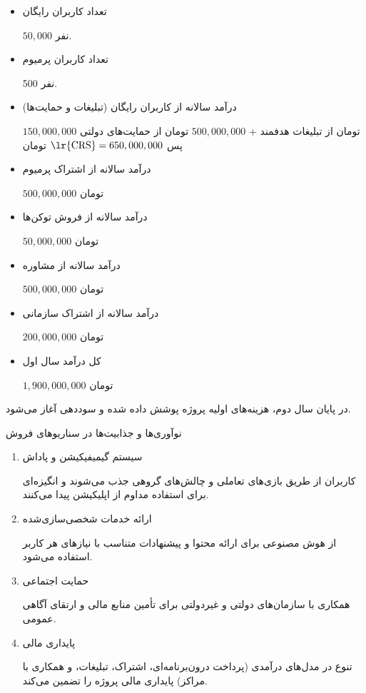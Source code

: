 \documentclass[dvipsnames, svgnames, x11names, 11pt]{article}
\begin{document}
\begin{itemize}
\item 
تعداد کاربران رایگان

$50,000$
نفر.

\item 
تعداد کاربران پرمیوم

500 نفر.

\item 
درآمد سالانه از کاربران رایگان (تبلیغات و حمایت‌ها) 

$150,000,000$
تومان از تبلیغات هدفمند +
$500,000,000$
تومان از حمایت‌های دولتی پس
$\text{\lr{CRS}} = 650,000,000$
تومان

\item 
درآمد سالانه از اشتراک پرمیوم

$500,000,000$
تومان

\item 
درآمد سالانه از فروش توکن‌ها

$50,000,000$
تومان

\item 
درآمد سالانه از مشاوره

$500,000,000$
تومان

\item 
درآمد سالانه از اشتراک سازمانی

$200,000,000$
تومان

\item 
کل درآمد سال اول

$1,900,000,000$
تومان
\end{itemize}

در پایان سال دوم، هزینه‌های اولیه پروژه پوشش داده شده و سوددهی آغاز می‌شود.

نوآوری‌ها و جذابیت‌ها در سناریوهای فروش
\begin{enumerate}
\item 
سیستم گیمیفیکیشن و پاداش

کاربران از طریق بازی‌های تعاملی و چالش‌های گروهی جذب می‌شوند و انگیزه‌ای برای استفاده مداوم از اپلیکیشن پیدا می‌کنند.

\item
ارائه خدمات شخصی‌سازی‌شده

از هوش مصنوعی برای ارائه محتوا و پیشنهادات متناسب با نیازهای هر کاربر استفاده می‌شود.

\item 
حمایت اجتماعی

همکاری با سازمان‌های دولتی و غیردولتی برای تأمین منابع مالی و ارتقای آگاهی عمومی.

\item 
پایداری مالی

تنوع در مدل‌های درآمدی (پرداخت درون‌برنامه‌ای، اشتراک، تبلیغات، و همکاری با مراکز) پایداری مالی پروژه را تضمین می‌کند.
\end{enumerate}
\end{document}
